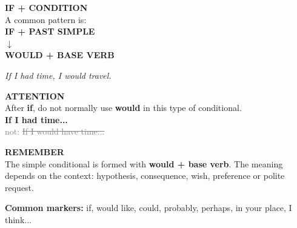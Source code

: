\documentclass[a4paper,11pt]{article}
\begin{document}
\begin{minipage}{0.91\textwidth}
\vspace{2mm}
\begin{minipage}{0.485\textwidth}
\begin{violetbox}[height=3.15cm]
\textbf{\color{VioletDark}IF + CONDITION}\\[1mm]
A common pattern is:\\[1mm]
\centering
\textbf{IF + PAST SIMPLE}\\
$\downarrow$\\
\textbf{WOULD + BASE VERB}\\[1mm]
\raggedright
\textit{If I had time, I would travel.}
\end{violetbox}
\end{minipage}\hfill
\begin{minipage}{0.485\textwidth}
\begin{warnbox}[height=3.15cm]
\textbf{\color{Red}ATTENTION}\\[1mm]
After \textbf{if}, do not normally use \textbf{would} in this type of conditional.\\[1mm]
\textbf{If I had time...}\\
\textcolor{Grey}{not: \sout{If I would have time...}}
\end{warnbox}
\end{minipage}

\vspace{2mm}
\begin{violetbox}
\textbf{\color{VioletDark}REMEMBER}\\[1mm]
The simple conditional is formed with \textbf{would + base verb}. The meaning depends on the context:
hypothesis, consequence, wish, preference or polite request.
\end{violetbox}

\vspace{1.5mm}\centering
{\small\color{Grey}\textbf{Common markers:} if, would like, could, probably, perhaps, in your place, I think...}

\end{minipage}
\end{document}
